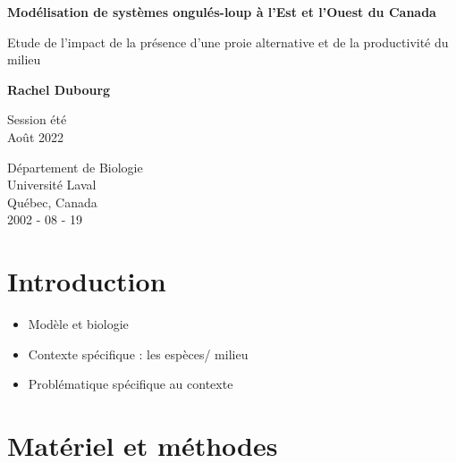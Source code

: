 \documentclass[a4paper, 12pt]{article}
\begin{document}

\begin{titlepage}
	\centering
	\vspace*{1cm}
	\Huge
	\textbf{Modélisation de systèmes ongulés-loup à l'Est et l'Ouest du Canada}

	\vspace{0.5cm}
	\LARGE
	Etude de l'impact de la présence d'une proie alternative et de la productivité du milieu

	\vspace{1.5cm}

	\textbf{Rachel Dubourg}

	\vfill

	Session été \\
	Août 2022

	\vspace{0.8cm}

	\Large
	Département de Biologie\\
	Université Laval \\
	Québec, Canada \\
	2002 - 08 - 19
\end{titlepage}

\newpage
% 

\newpage

% 
\section{Introduction}
 \begin{itemize}
     \item Modèle et biologie
     \item Contexte spécifique : les espèces/ milieu
     \item Problématique spécifique au contexte
 \end{itemize}

\newpage
\section{Matériel et méthodes}



\newpage
% 




\newpage
% 

% 
% 

% 


\newpage

\end{document}
